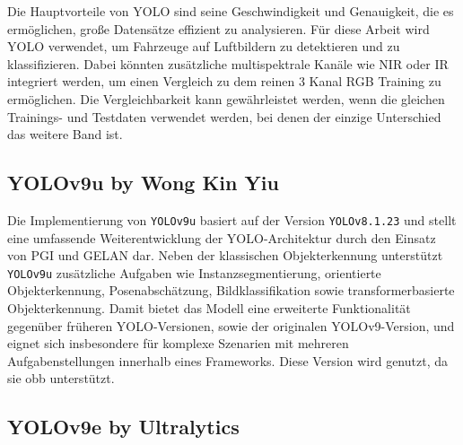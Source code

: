 Die Hauptvorteile von \acrshort{YOLO} sind seine Geschwindigkeit und Genauigkeit, die es ermöglichen, große Datensätze effizient zu analysieren. Für diese Arbeit wird \acrshort{YOLO} verwendet, um Fahrzeuge auf Luftbildern zu detektieren und zu klassifizieren. Dabei könnten zusätzliche multispektrale Kanäle wie \acrshort{NIR} oder \acrshort{IR} integriert werden, um einen Vergleich zu dem reinen 3 Kanal \acrshort{RGB} Training zu ermöglichen. Die Vergleichbarkeit kann gewährleistet werden, wenn die gleichen Trainings- und Testdaten verwendet werden, bei denen der einzige Unterschied das weitere Band ist.


\subsection{YOLOv9u by Wong Kin Yiu}
\label{subsec:yolov9u}

Die Implementierung von \texttt{YOLOv9u} basiert auf der Version \texttt{YOLOv8.1.23}\cite{yolo_v9u_github} und stellt eine umfassende Weiterentwicklung der \acrshort{YOLO}-Architektur durch den Einsatz von \acrshort{PGI} und \acrshort{GELAN} dar. Neben der klassischen Objekterkennung unterstützt \texttt{YOLOv9u} zusätzliche Aufgaben wie Instanzsegmentierung, orientierte Objekterkennung, Posenabschätzung, Bildklassifikation sowie transformerbasierte Objekterkennung\cite{wang2024}. Damit bietet das Modell eine erweiterte Funktionalität gegenüber früheren \acrshort{YOLO}-Versionen, sowie der originalen \acrshort{YOLO}v9-Version, und eignet sich insbesondere für komplexe Szenarien mit mehreren Aufgabenstellungen innerhalb eines Frameworks. Diese Version wird genutzt, da sie \acrlong{obb} unterstützt.

\subsection{YOLOv9e by Ultralytics}
\label{subsec:yolov9e}

